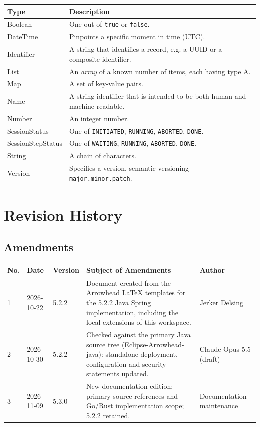 \documentclass[a4paper]{arrowhead}
\newcommand{\pdef}[1]{{\textcolor{ArrowheadGrey}{#1\label{sec:model:primitives:#1}\label{sec:model:primitives:#1s}\label{sec:model:primitives:#1es}}}}
\begin{document}
\noindent\begin{tabularx}{\textwidth}{| p{4.6cm} | X |} \hline
\rowcolor{gray!33} Type & Description \\ \hline
\pdef{Boolean} & One out of \texttt{true} or \texttt{false}. \\ \hline
\pdef{DateTime} & Pinpoints a specific moment in time (UTC). \\ \hline
\pdef{Identifier} & A string that identifies a record, e.g. a UUID or a composite identifier. \\ \hline
\pdef{List} & An \textit{array} of a known number of items, each having type A. \\ \hline
\pdef{Map} & A set of key-value pairs. \\ \hline
\pdef{Name} & A string identifier that is intended to be both human and machine-readable. \\ \hline
\pdef{Number} & An integer number. \\ \hline
\pdef{SessionStatus} & One of \texttt{INITIATED}, \texttt{RUNNING}, \texttt{ABORTED}, \texttt{DONE}. \\ \hline
\pdef{SessionStepStatus} & One of \texttt{WAITING}, \texttt{RUNNING}, \texttt{ABORTED}, \texttt{DONE}. \\ \hline
\pdef{String} & A chain of characters. \\ \hline
\pdef{Version} & Specifies a version, semantic versioning \texttt{major.minor.patch}. \\ \hline
\end{tabularx}

\newpage




\newpage

\section{Revision History}
\subsection{Amendments}

\noindent\begin{tabularx}{\textwidth}{| p{1cm} | p{3cm} | p{2cm} | X | p{4cm} |} \hline
\rowcolor{gray!33} No. & Date & Version & Subject of Amendments & Author \\ \hline

1 & 2026-10-22 & 5.2.2 & Document created from the Arrowhead LaTeX templates for the 5.2.2 Java Spring implementation, including the local extensions of this workspace. & Jerker Delsing \\ \hline
2 & 2026-10-30 & 5.2.2 & Checked against the primary Java source tree (Eclipse-Arrowhead-java): standalone deployment, configuration and security statements updated. & Claude Opus 5.5 (draft) \\ \hline
3 & 2026-11-09 & 5.3.0 & New documentation edition; primary-source references and Go/Rust implementation scope; 5.2.2 retained. & Documentation maintenance \\ \hline
\end{tabularx}
\end{document}
